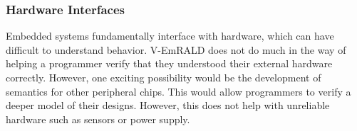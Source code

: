 \documentclass[preprint,11pt]{sigplanconf}
\begin{document}
\subsubsection{Hardware Interfaces}
Embedded systems fundamentally interface with hardware, which can have
difficult to understand behavior.  V-EmRALD does not do much in the
way of helping a programmer verify that they understood their external
hardware correctly. However, one exciting possibility would be the
development of semantics for other peripheral chips.  This would allow
programmers to verify a deeper model of their designs. However, this
does not help with unreliable hardware such as sensors or power supply.











\begingroup
\raggedright

\endgroup
\end{document}
